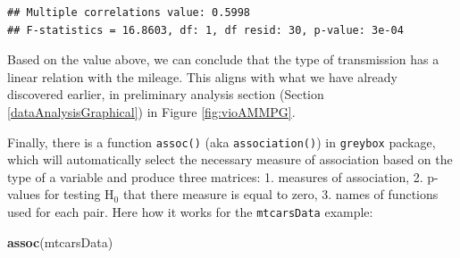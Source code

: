 \documentclass[
]{book}
\newenvironment{Shaded}{\begin{snugshade}}{\end{snugshade}}
\newcommand{\KeywordTok}[1]{\textcolor[rgb]{0.13,0.29,0.53}{\textbf{#1}}}
\newcommand{\NormalTok}[1]{#1}
\newcommand{\OperatorTok}[1]{\textcolor[rgb]{0.81,0.36,0.00}{\textbf{#1}}}
\theoremstyle{definition}
\theoremstyle{definition}
\theoremstyle{definition}
\theoremstyle{definition}
\theoremstyle{remark}
\begin{document}
\begin{Shaded}
\end{Shaded}

\begin{verbatim}
## Multiple correlations value: 0.5998
## F-statistics = 16.8603, df: 1, df resid: 30, p-value: 3e-04
\end{verbatim}

Based on the value above, we can conclude that the type of transmission has a linear relation with the mileage. This aligns with what we have already discovered earlier, in preliminary analysis section (Section \ref{dataAnalysisGraphical}) in Figure \ref{fig:vioAMMPG}.

Finally, there is a function \texttt{assoc()} (aka \texttt{association()}) in \texttt{greybox} package, which will automatically select the necessary measure of association based on the type of a variable and produce three matrices: 1. measures of association, 2. p-values for testing H\(_0\) that there measure is equal to zero, 3. names of functions used for each pair. Here how it works for the \texttt{mtcarsData} example:

\begin{Shaded}
\begin{Highlighting}[]
\KeywordTok{assoc}\NormalTok{(mtcarsData)}
\end{Highlighting}
\end{Shaded}
\end{document}
